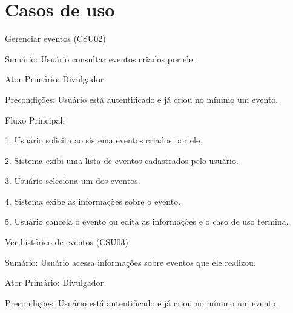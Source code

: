 \documentclass{article}
\begin{document}
	\section{Casos de uso} 
	\noindent{}\bigskip
	
	Gerenciar eventos (CSU02)
	
	Sumário: Usuário consultar eventos criados por ele.
	
	Ator Primário: Divulgador.
	
	Precondições: Usuário está autentificado e já criou no mínimo um evento.
	
	Fluxo Principal:
	
	1. Usuário solicita ao sistema eventos criados por ele.
	
	2. Sistema exibi uma lista de eventos cadastrados pelo usuário.
	
	3. Usuário seleciona um dos eventos.
	
	4. Sistema exibe as informações sobre o evento.
	
	5. Usuário cancela o evento ou edita as informações e o caso de uso termina.\bigskip
	
	Ver histórico de eventos (CSU03)
	
	Sumário: Usuário acessa informações sobre eventos que ele realizou.
	
	Ator Primário: Divulgador
	
	Precondições: Usuário está autentificado e já criou no mínimo um evento.
	
\end{document}
